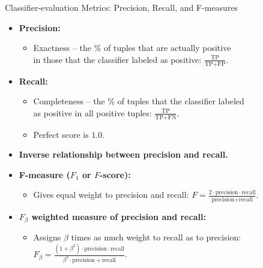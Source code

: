 \begin{frame}{Classifier-evaluation Metrics: Precision, Recall, and F-measures}
	\begin{itemize}
		\item \textbf{Precision:}
		      \begin{itemize}
			      \item Exactness -- the $\%$ of tuples that are actually positive \\
			            in those that the classifier labeled as positive: $\frac{\text{TP}}{\text{TP} + \text{FP}}$.
		      \end{itemize}
		\item \textbf{Recall:}
		      \begin{itemize}
			      \item Completeness -- the $\%$ of tuples that the classifier labeled \\
			            as positive in all positive tuples: $\frac{\text{TP}}{\text{TP} + \text{FN}}$.
			      \item Perfect score is $1.0$.
		      \end{itemize}
		\item \textbf{Inverse relationship between precision and recall.}%
		\item \textbf{F-measure ($F_1$ or $F$-score):}
		      \begin{itemize}
			      \item Gives equal weight to precision and recall: $F = \frac{2\cdot\text{precision}\cdot \text{recall}}{\text{precision} + \text{recall}}$.
		      \end{itemize}
		\item \textbf{$F_\beta$ weighted measure of precision and recall:}
		      \begin{itemize}
			      \item Assigns $\beta$ times as much weight to recall as to precision: $F_\beta = \frac{(1+\beta^2) \cdot \text{precision} \cdot \text{recall}}{\beta^2 \cdot \text{precision} + \text{recall}}$.
		      \end{itemize}
	\end{itemize} %
\end{frame}

